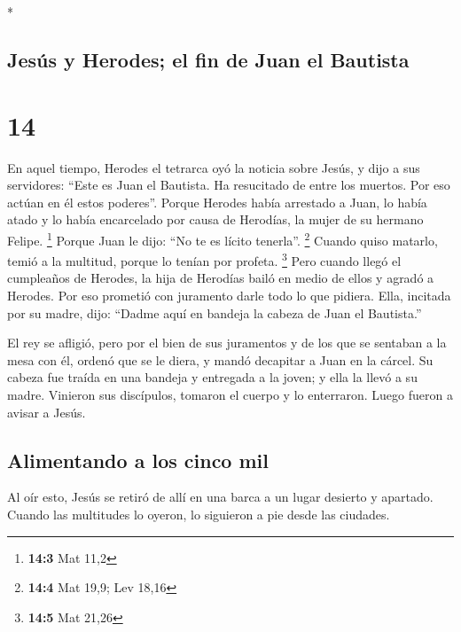 \begin{paracol}{2}
\switchcolumn[0]*

\hypertarget{jesuxfas-y-herodes-el-fin-de-juan-el-bautista}{%
\subsection{Jesús y Herodes; el fin de Juan el
Bautista}\label{jesuxfas-y-herodes-el-fin-de-juan-el-bautista}}

\hypertarget{section-26}{%
\section{14}\label{section-26}}

 En aquel tiempo, Herodes el tetrarca oyó la noticia sobre
Jesús,  y dijo a sus servidores: ``Este es Juan el
Bautista. Ha resucitado de entre los muertos. Por eso actúan en él estos
poderes''.  Porque Herodes había arrestado a Juan, lo
había atado y lo había encarcelado por causa de Herodías, la mujer de su
hermano Felipe. \footnote{\textbf{14:3} Mat 11,2}  Porque
Juan le dijo: ``No te es lícito tenerla''. \footnote{\textbf{14:4} Mat
  19,9; Lev 18,16}  Cuando quiso matarlo, temió a la
multitud, porque lo tenían por profeta. \footnote{\textbf{14:5} Mat
  21,26}  Pero cuando llegó el cumpleaños de Herodes, la
hija de Herodías bailó en medio de ellos y agradó a Herodes.
 Por eso prometió con juramento darle todo lo que pidiera.
 Ella, incitada por su madre, dijo: ``Dadme aquí en
bandeja la cabeza de Juan el Bautista.''

 El rey se afligió, pero por el bien de sus juramentos y
de los que se sentaban a la mesa con él, ordenó que se le diera,
 y mandó decapitar a Juan en la cárcel. 
Su cabeza fue traída en una bandeja y entregada a la joven; y ella la
llevó a su madre.  Vinieron sus discípulos, tomaron el
cuerpo y lo enterraron. Luego fueron a avisar a Jesús.

\hypertarget{alimentando-a-los-cinco-mil}{%
\subsection{Alimentando a los cinco
mil}\label{alimentando-a-los-cinco-mil}}

 Al oír esto, Jesús se retiró de allí en una barca a un
lugar desierto y apartado. Cuando las multitudes lo oyeron, lo siguieron
a pie desde las ciudades.


\end{paracol}
